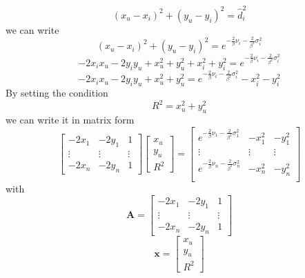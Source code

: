 \documentclass[12pt]{report}
\begin{document}
\begin{equation}
    (x_u-x_i)^2+(y_u-y_i)^2=\hat{d}_i^2
\end{equation}
we can write
\begin{equation}
    (x_u-x_i)^2+(y_u-y_i)^2=e^{-\frac{2}{\beta}\nu_i-\frac{2}{\beta^2}\sigma^2_i}
\end{equation}
\begin{equation}
    -2x_ix_u-2y_iy_u+x^2_u+y^2_u+x_i^2+y_i^2=e^{-\frac{2}{\beta}\nu_i-\frac{2}{\beta^2}\sigma^2_i}
\end{equation}
\begin{equation}
    -2x_ix_u-2y_iy_u+x_u^2+y_u^2=e^{-\frac{2}{\beta}\nu_i-\frac{2}{\beta^2}\sigma^2_i}-x_i^2-y_i^2
\end{equation}
By setting the condition 
\begin{equation}
R^2=x_u^2+y_u^2    
\label{eq:10}
\end{equation}
we can write it in matrix form
\begin{equation}
    \begin{bmatrix}
        -2x_1 & -2y_1 & 1\\
        \vdots&\vdots&\vdots\\
        -2x_n & -2y_n & 1
    \end{bmatrix}
    \begin{bmatrix}
        x_u\\
        y_u\\
        R^2
    \end{bmatrix} = 
    \begin{bmatrix}
       e^{-\frac{2}{\beta}\nu_1-\frac{2}{\beta^2}\sigma^2_1} & -x_1^2 & -y_1^2\\
        \vdots&\vdots&\vdots\\
        e^{-\frac{2}{\beta}\nu_n-\frac{2}{\beta^2}\sigma^2_n} & -x_n^2 & -y_n^2\\
    \end{bmatrix}
\end{equation}
with $$\mathbf{A}=\begin{bmatrix}
        -2x_1 & -2y_1 & 1\\
        \vdots&\vdots&\vdots\\
        -2x_n & -2y_n & 1
    \end{bmatrix}$$
$$\mathbf{x} =     \begin{bmatrix}
        x_u\\
        y_u\\
        R^2
    \end{bmatrix}$$
\end{document}
